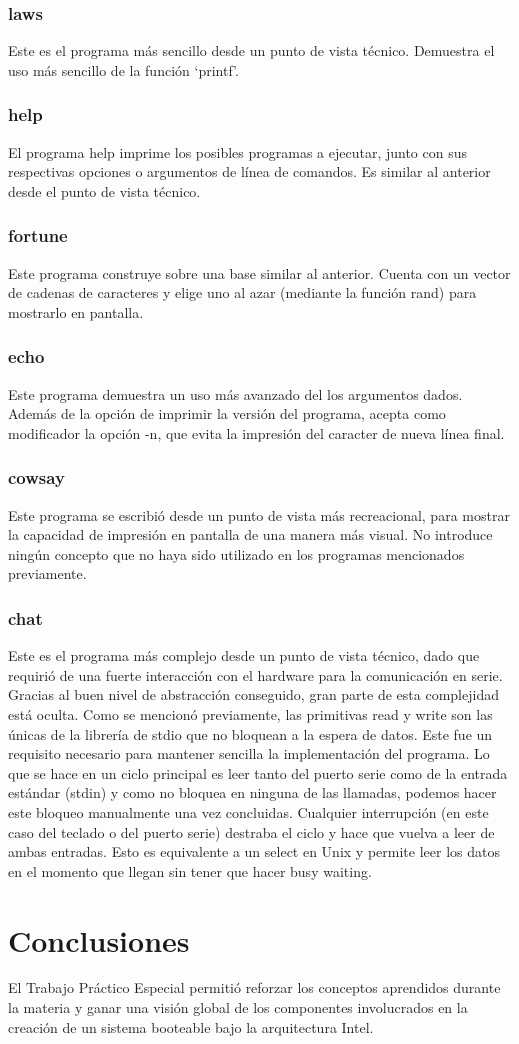 \documentclass[11pt]{article}
\begin{document}
\subsubsection{laws}
Este es el programa más sencillo desde un punto de vista técnico. Demuestra el uso más sencillo de la función ‘printf’.

\subsubsection{help}
El programa help imprime los posibles programas a ejecutar, junto con sus respectivas opciones o argumentos de línea de comandos. Es similar al anterior desde el punto de vista técnico.

\subsubsection{fortune}
Este programa construye sobre una base similar al anterior. Cuenta con un vector de cadenas de caracteres y elige uno al azar (mediante la función rand) para mostrarlo en pantalla.

\subsubsection{echo}
Este programa demuestra un uso más avanzado del los argumentos dados. Además de la opción de imprimir la versión del programa, acepta como modificador la opción -n, que evita la impresión del caracter de nueva línea final.

\subsubsection{cowsay}
Este programa se escribió desde un punto de vista más recreacional, para mostrar la capacidad de impresión en pantalla de una manera más visual. No introduce ningún concepto que no haya sido utilizado en los programas mencionados previamente.

\subsubsection{chat}
Este es el programa más complejo desde un punto de vista técnico, dado que requirió de una fuerte interacción con el hardware para la comunicación en serie. Gracias al buen nivel de abstracción conseguido, gran parte de esta complejidad está oculta. Como se mencionó previamente, las primitivas read y write son las únicas de la librería de stdio que no bloquean a la espera de datos.
Este fue un requisito necesario para mantener sencilla la implementación del programa. Lo que se hace en un ciclo principal es leer tanto del puerto serie como de la entrada estándar (stdin) y como no bloquea en ninguna de las llamadas, podemos hacer este bloqueo manualmente una vez concluidas. Cualquier interrupción (en este caso del teclado o del puerto serie) destraba el ciclo y hace que vuelva a leer de ambas entradas. Esto es equivalente a un select en Unix y permite leer los datos en el momento que llegan sin tener que hacer busy waiting.

\section{Conclusiones}

El Trabajo Práctico Especial permitió reforzar los conceptos aprendidos durante la materia y ganar una visión global de los componentes involucrados en la creación de un sistema booteable bajo la arquitectura Intel.
\end{document}

